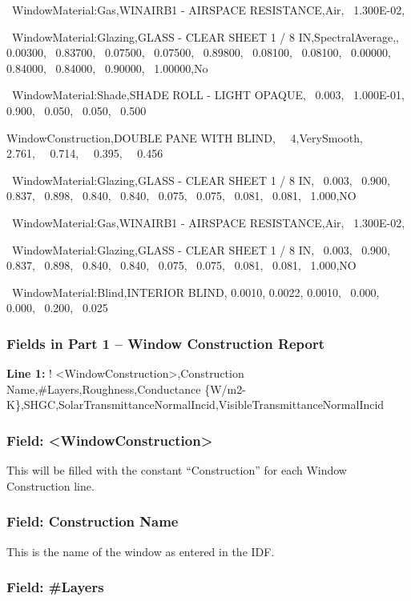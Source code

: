 ~WindowMaterial:Gas,WINAIRB1 - AIRSPACE RESISTANCE,Air,~ 1.300E-02,

~WindowMaterial:Glazing,GLASS - CLEAR SHEET 1 / 8 IN,SpectralAverage,,~ 0.00300,~ 0.83700,~ 0.07500,~ 0.07500,~ 0.89800,~ 0.08100,~ 0.08100,~ 0.00000,~ 0.84000,~ 0.84000,~ 0.90000,~ 1.00000,No

~WindowMaterial:Shade,SHADE ROLL - LIGHT OPAQUE,~ 0.003,~ 1.000E-01,~ 0.900,~ 0.050,~ 0.050,~ 0.500

WindowConstruction,DOUBLE PANE WITH BLIND,~~ 4,VerySmooth,~~ 2.761,~~ 0.714,~~ 0.395,~~ 0.456

~WindowMaterial:Glazing,GLASS - CLEAR SHEET 1 / 8 IN,~ 0.003,~ 0.900,~ 0.837,~ 0.898,~ 0.840,~ 0.840,~ 0.075,~ 0.075,~ 0.081,~ 0.081,~ 1.000,NO

~WindowMaterial:Gas,WINAIRB1 - AIRSPACE RESISTANCE,Air,~ 1.300E-02,

~WindowMaterial:Glazing,GLASS - CLEAR SHEET 1 / 8 IN,~ 0.003,~ 0.900,~ 0.837,~ 0.898,~ 0.840,~ 0.840,~ 0.075,~ 0.075,~ 0.081,~ 0.081,~ 1.000,NO

~WindowMaterial:Blind,INTERIOR BLIND, 0.0010, 0.0022, 0.0010,~ 0.000,~ 0.000,~ 0.200,~ 0.025

\subsubsection{Fields in Part 1 -- Window Construction Report}\label{fields-in-part-1-window-construction-report}

\textbf{Line 1:} ! \textless{}WindowConstruction\textgreater{},Construction Name,\#Layers,Roughness,Conductance \{W/m2-K\},SHGC,SolarTransmittanceNormalIncid,VisibleTransmittanceNormalIncid

\subsubsection{Field: \textless{}WindowConstruction\textgreater{}}\label{field-windowconstruction}

This will be filled with the constant ``Construction'' for each Window Construction line.

\subsubsection{Field: Construction Name}\label{field-construction-name-1}

This is the name of the window as entered in the IDF.

\subsubsection{Field: \#Layers}\label{field-layers-1}


